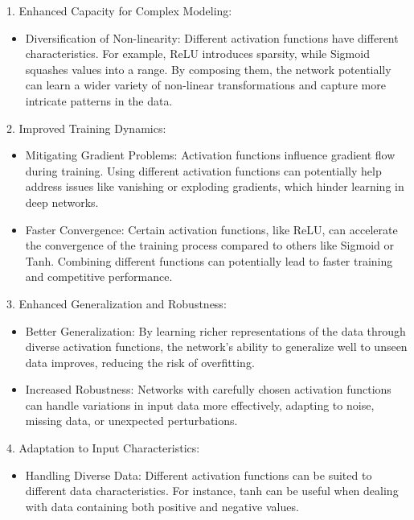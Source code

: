 \documentclass[10pt]{NSP1}
\numberwithin{equation}{section}
\begin{document}
1. Enhanced Capacity for Complex Modeling:

\begin{itemize}
\item Diversification of Non-linearity: Different activation functions have
different characteristics. For example, ReLU introduces sparsity, while
Sigmoid squashes values into a range. By composing them, the network
potentially can learn a wider variety of non-linear transformations and
capture more intricate patterns in the data.
\end{itemize}

2. Improved Training Dynamics:

\begin{itemize}
\item Mitigating Gradient Problems: Activation functions influence gradient
flow during training. Using different activation functions can potentially
help address issues like vanishing or exploding gradients, which hinder
learning in deep networks.

\item Faster Convergence: Certain activation functions, like ReLU, can
accelerate the convergence of the training process compared to others like
Sigmoid or Tanh. Combining different functions can potentially lead to
faster training and competitive performance.
\end{itemize}

3. Enhanced Generalization and Robustness:

\begin{itemize}
\item Better Generalization: By learning richer representations of the data
through diverse activation functions, the network's ability to generalize
well to unseen data improves, reducing the risk of overfitting.

\item Increased Robustness: Networks with carefully chosen activation
functions can handle variations in input data more effectively, adapting to
noise, missing data, or unexpected perturbations.
\end{itemize}

4. Adaptation to Input Characteristics:

\begin{itemize}
\item Handling Diverse Data: Different activation functions can be suited to
different data characteristics. For instance, tanh can be useful when
dealing with data containing both positive and negative values.
\end{itemize}
\end{document}
